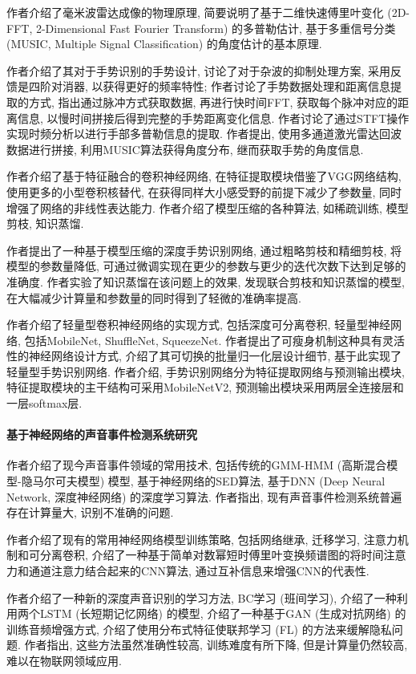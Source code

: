 \documentclass[]{ctexart}
\begin{document}
	作者介绍了毫米波雷达成像的物理原理, 简要说明了基于二维快速傅里叶变化 (2D-FFT, 2-Dimensional Fast Fourier Transform) 的多普勒估计, 基于多重信号分类 (MUSIC, Multiple Signal Classification) 的角度估计的基本原理. 

	作者介绍了其对于手势识别的手势设计, 讨论了对于杂波的抑制处理方案, 采用反馈是四阶对消器, 以获得更好的频率特性; 作者讨论了手势数据处理和距离信息提取的方式, 指出通过脉冲方式获取数据, 再进行快时间FFT, 获取每个脉冲对应的距离信息, 以慢时间拼接后得到完整的手势距离变化信息. 作者讨论了通过STFT操作实现时频分析以进行手部多普勒信息的提取. 作者提出, 使用多通道激光雷达回波数据进行拼接, 利用MUSIC算法获得角度分布, 继而获取手势的角度信息. 
	
	作者介绍了基于特征融合的卷积神经网络, 在特征提取模块借鉴了VGG网络结构, 使用更多的小型卷积核替代, 在获得同样大小感受野的前提下减少了参数量, 同时增强了网络的非线性表达能力. 作者介绍了模型压缩的各种算法, 如稀疏训练, 模型剪枝, 知识蒸馏. 
	
	作者提出了一种基于模型压缩的深度手势识别网络, 通过粗略剪枝和精细剪枝, 将模型的参数量降低, 可通过微调实现在更少的参数与更少的迭代次数下达到足够的准确度. 作者实验了知识蒸馏在该问题上的效果, 发现联合剪枝和知识蒸馏的模型, 在大幅减少计算量和参数量的同时得到了轻微的准确率提高. 
	
	作者介绍了轻量型卷积神经网络的实现方式, 包括深度可分离卷积, 轻量型神经网络, 包括MobileNet, ShuffleNet, SqueezeNet. 作者提出了可瘦身机制这种具有灵活性的神经网络设计方式, 介绍了其可切换的批量归一化层设计细节, 基于此实现了轻量型手势识别网络. 作者介绍, 手势识别网络分为特征提取网络与预测输出模块, 特征提取模块的主干结构可采用MobileNetV2, 预测输出模块采用两层全连接层和一层softmax层. 
	
\paragraph{基于神经网络的声音事件检测系统研究\cite{sound}} 作者介绍了现今声音事件领域的常用技术, 包括传统的GMM-HMM (高斯混合模型-隐马尔可夫模型) 模型, 基于神经网络的SED算法, 基于DNN (Deep Neural Network, 深度神经网络) 的深度学习算法. 作者指出, 现有声音事件检测系统普遍存在计算量大, 识别不准确的问题. 
	
	作者介绍了现有的常用神经网络模型训练策略, 包括网络继承, 迁移学习, 注意力机制和可分离卷积, 介绍了一种基于简单对数幂短时傅里叶变换频谱图的将时间注意力和通道注意力结合起来的CNN算法, 通过互补信息来增强CNN的代表性. 

	作者介绍了一种新的深度声音识别的学习方法, BC学习 (班间学习), 介绍了一种利用两个LSTM (长短期记忆网络) 的模型, 介绍了一种基于GAN (生成对抗网络) 的训练音频增强方式, 介绍了使用分布式特征使联邦学习 (FL) 的方法来缓解隐私问题. 作者指出, 这些方法虽然准确性较高, 训练难度有所下降, 但是计算量仍然较高, 难以在物联网领域应用. 
	
\end{document}
